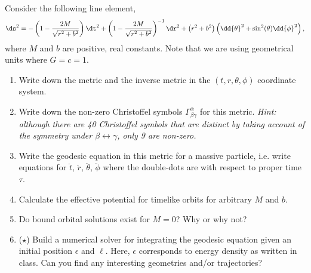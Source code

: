 \begin{problem}[2]
  Consider the following line element,
  \[%
    \ds^2 = -\left(1 - \frac{2M}{\sqrt{r^2 + b^2}}\right)\dt^2 + \left(1 - \frac{2M}{\sqrt{r^2 + b^2}}\right)^{-1} \dr^2 + \left(r^2 + b^2\right)\left(\dd{\theta}^2 + \sin^2(\theta)\dd{\phi}^2\right)
  ,\]%
  where $M$ and $b$ are positive, real constants. Note that we are using geometrical units where $G = c = 1$.
  \begin{enumerate}
    \item Write down the metric and the inverse metric in the $(t, r, \theta, \phi)$ coordinate system.
    \item Write down the non-zero Christoffel symbols $\Gamma_{\beta\gamma}^\alpha$ for this metric. \textit{Hint: although there are 40 Christoffel symbols that are distinct by taking account of the symmetry under $\beta \leftrightarrow \gamma$, only 9 are non-zero.}
    \item Write the geodesic equation in this metric for a massive particle, i.e. write equations for $\ddot{t}$, $\ddot{r}$, $\ddot{\theta}$, $\ddot{\phi}$ where the double-dots are with respect to proper time $\tau$.
    \item Calculate the effective potential for timelike orbits for arbitrary $M$ and $b$.
    \item Do bound orbital solutions exist for $M = 0$? Why or why not?
    \item ($\star$) Build a numerical solver for integrating the geodesic equation given an initial position $\epsilon$ and $\ell$. Here, $\epsilon$ corresponds to energy density as written in class. Can you find any interesting geometries and/or trajectories?
  \end{enumerate}
\end{problem}

